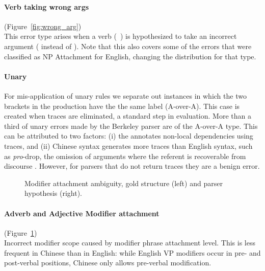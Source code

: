 \paragraph{Verb taking wrong args} (Figure~\ref{fig:wrong_arg}) \\
This error type
arises when a verb \mbox{(\myeg~)} is hypothesized to take
an incorrect argument (\mbox{} instead of
\mbox{}).  Note that this also covers some of the errors
that were classified as NP Attachment for English, changing
the distribution for that type.

\paragraph{Unary}
For mis-application of unary rules we separate out instances in which the two brackets in the production have the the same label (A-over-A).
This case is created when traces are eliminated, a standard step in evaluation.
More than a third of unary errors made by the Berkeley parser are of the A-over-A type.
This can be attributed to two factors: (i) the \pctb annotates non-local dependencies using traces, and (ii) Chinese syntax generates more traces than English syntax, such as \emph{pro}-drop, the omission of arguments where the referent is recoverable from discourse \parencite{Guo-Wang-VanGenabith:2007:EMNLP}.
However, for parsers that do not return traces they are a benign error.

\begin{figure}
\centering
  \caption[Error analysis example: adverb and adjective modifier attachment (Chinese).]{ \label{fig:mod_att}
    Modifier attachment ambiguity, gold structure (left) and parser hypothesis (right).
  }
\end{figure}

\paragraph{Adverb and Adjective Modifier attachment} (Figure~\ref{fig:mod_att}) \\
Incorrect modifier scope caused by modifier phrase attachment level.
This is less frequent in Chinese than in English: while English VP modifiers occur in pre- and post-verbal positions, Chinese only allows pre-verbal modification.

